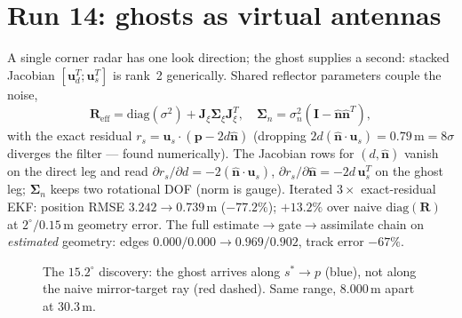 \documentclass[11pt,oneside]{book}
\begin{document}
\section{Run 14: ghosts as virtual antennas}
\label{sec:aperture}

A single corner radar has one look direction; the ghost supplies a second:
stacked Jacobian $[\mathbf{u}_d^T;\mathbf{u}_s^T]$ is rank~2 generically.
Shared reflector parameters couple the noise,
\begin{equation}
\boxed{\mathbf{R}_{\mathrm{eff}}=\mathrm{diag}(\sigma^2)
+\mathbf{J}_\xi\boldsymbol{\Sigma}_\xi\mathbf{J}_\xi^T,\quad
\boldsymbol{\Sigma}_n=\sigma_n^2(\mathbf{I}-\hat{\mathbf{n}}\hat{\mathbf{n}}^T),}
\label{eq:reff}
\end{equation}
with the exact residual $r_s=\mathbf{u}_s\!\cdot\!(\mathbf{p}-2d\hat{\mathbf{n}})$
(dropping $2d(\hat{\mathbf{n}}\!\cdot\!\mathbf{u}_s)=0.79\,\mathrm{m}=8\sigma$
diverges the filter --- found numerically). The Jacobian rows for
$(d,\hat{\mathbf{n}})$ vanish on the direct leg and read
$\partial r_s/\partial d=-2(\hat{\mathbf{n}}\!\cdot\!\mathbf{u}_s)$,
$\partial r_s/\partial\hat{\mathbf{n}}=-2d\,\mathbf{u}_s^T$ on the ghost leg;
$\boldsymbol{\Sigma}_n$ keeps two rotational DOF (norm is gauge).
Iterated $3\times$ exact-residual EKF: position RMSE
$3.242\to0.739\,\mathrm{m}$ ($-77.2\%$); $+13.2\%$ over naive
$\mathrm{diag}(\mathbf{R})$ at $2^\circ/0.15\,\mathrm{m}$ geometry error.
The full estimate$\to$gate$\to$assimilate chain on \emph{estimated}
geometry: edges $0.000/0.000\to0.969/0.902$, track error $-67\%$.

\begin{figure}[htbp]
\centering
{}
\caption{The $15.2^\circ$ discovery: the ghost arrives along $s^*\!\to\!p$
(blue), not along the naive mirror-target ray (red dashed). Same range,
$8.000\,\mathrm{m}$ apart at $30.3\,\mathrm{m}$.}
\label{fig:specular-error}
\end{figure}
\end{document}
